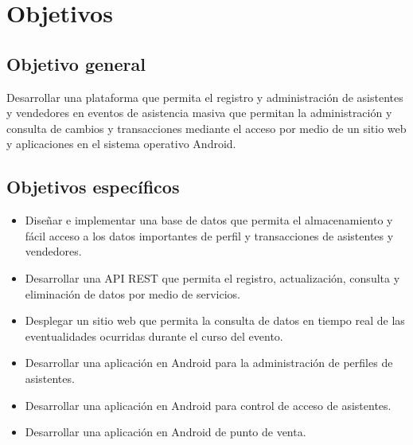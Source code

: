 \section{Objetivos}

		\subsection*{Objetivo general}
			Desarrollar una plataforma que permita el registro y administración de asistentes y vendedores en eventos de asistencia masiva que permitan la administración y consulta de cambios y transacciones mediante el acceso por medio de un sitio web y aplicaciones en el sistema operativo Android.
		\subsection*{Objetivos específicos}
		\begin{itemize}
			\item Diseñar e implementar una base de datos que permita el almacenamiento y fácil acceso a los datos importantes de perfil y transacciones de asistentes y vendedores.
			\item Desarrollar una API REST que permita el registro, actualización, consulta y eliminación de datos por medio de servicios.
			\item Desplegar un sitio web que permita la consulta de datos en tiempo real de las eventualidades ocurridas durante el curso del evento.
			\item Desarrollar una aplicación en Android para la administración de perfiles de asistentes.
			\item Desarrollar una aplicación en Android para control de acceso de asistentes.
			\item Desarrollar una aplicación en Android de punto de venta.
		\end{itemize}
